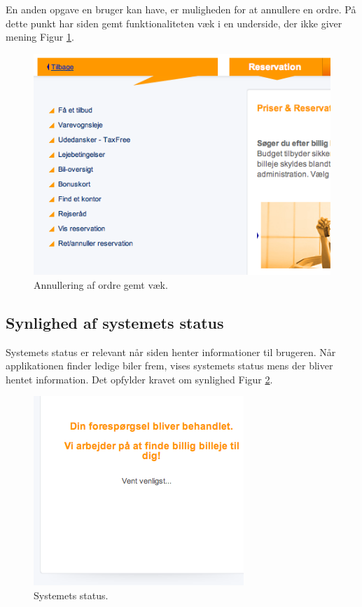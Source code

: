 \documentclass[a4paper]{article}
\begin{document}
En anden opgave en bruger kan have, er muligheden for at annullere en ordre. På
dette punkt har siden gemt funktionaliteten væk i en underside, der ikke giver
mening Figur \ref{annullering}.

\begin{figure}[htbp]
  \begin{center}
    \includegraphics[scale=.6]{3.png}
  \end{center}
  \caption{Annullering af ordre gemt væk.}
  \label{annullering}
\end{figure}

\subsection{Synlighed af systemets status}
Systemets status er relevant når siden henter informationer til brugeren. Når
applikationen finder ledige biler frem, vises systemets status mens der bliver
hentet information. Det opfylder kravet om synlighed Figur \ref{status}.

\begin{figure}[htbp]
  \begin{center}
    \includegraphics[scale=.6]{4.png}
  \end{center}
  \caption{Systemets status.}
  \label{status}
\end{figure}
\end{document}
